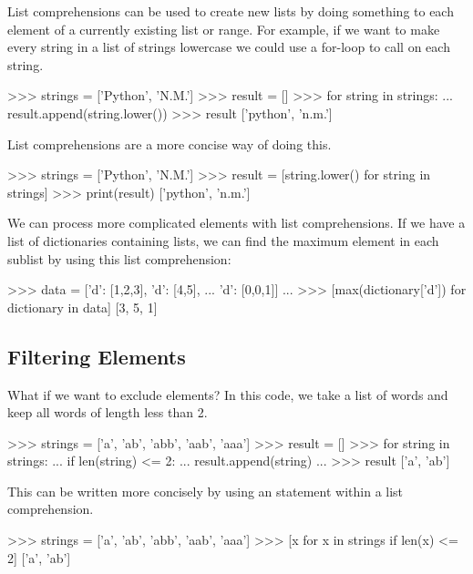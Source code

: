 \documentclass[11pt]{cselabheader}
\begin{document}
List comprehensions can be used to create new lists by doing something
to each element of a currently existing list or range. For example, if
we want to make every string in a list of strings lowercase we could use
a for-loop to call  on each string.

\begin{pyconcode}
>>> strings = ['Python', 'N.M.']
>>> result = []
>>> for string in strings:
...    result.append(string.lower())
>>> result
['python', 'n.m.']

\end{pyconcode}

List comprehensions are a more concise way of doing this.

\begin{pyconcode}
>>> strings = ['Python', 'N.M.']
>>> result = [string.lower() for string in strings]
>>> print(result)
['python', 'n.m.']

\end{pyconcode}

We can process more complicated elements with list comprehensions.
If we have a list of dictionaries containing lists, we can find the maximum
element in each sublist by using this list comprehension:

\begin{pyconcode}
>>> data = [{'d': [1,2,3]}, {'d': [4,5]},
...         {'d': [0,0,1]}]
...
>>> [max(dictionary['d']) for dictionary in data]
[3, 5, 1]

\end{pyconcode}

\subsection{Filtering Elements}

What if we want to exclude elements? In this code, we take a list of words
and keep all words of length less than 2.

\begin{pyconcode}
>>> strings = ['a', 'ab', 'abb', 'aab', 'aaa']
>>> result = []
>>> for string in strings:
...    if len(string) <= 2:
...        result.append(string)
...
>>> result
['a', 'ab']

\end{pyconcode}

This can be written more concisely by using an 
statement within a list comprehension.

\begin{pyconcode}
>>> strings = ['a', 'ab', 'abb', 'aab', 'aaa']
>>> [x for x in strings if len(x) <= 2]
['a', 'ab']

\end{pyconcode}
\end{document}
